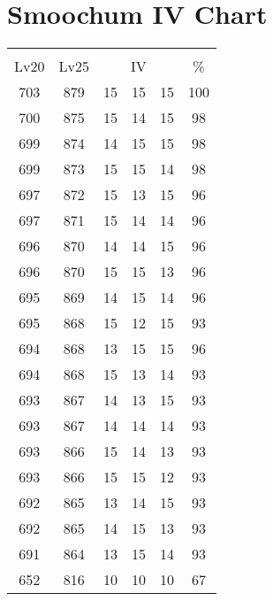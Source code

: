 \documentclass{article}%
\begin{document}
%
\normalsize%
\section{Smoochum IV Chart}%
\label{sec:Smoochum IV Chart}%
\renewcommand{\arraystretch}{1.5}%
\begin{tabular}{|c|c|c|c|c|c|}%
\hline%
\multicolumn{6}{|c|}{\textcolor{white}{ 
\linebreak{Smoochum}
}%
\cellcolor{black}}\\%
\multicolumn{1}{|c}{Lv20}&\multicolumn{1}{c|}{Lv25}&\multicolumn{3}{c|}{IV}&\multicolumn{1}{|c|}{\%}\\%
\hline%
\rowcolor{color100}%
703&879&15&15&15&100\\%
\hline%
\rowcolor{color98}%
700&875&15&14&15&98\\%
\hline%
\rowcolor{color98}%
699&874&14&15&15&98\\%
\hline%
\rowcolor{color98}%
699&873&15&15&14&98\\%
\hline%
\rowcolor{color96}%
697&872&15&13&15&96\\%
\hline%
\rowcolor{color96}%
697&871&15&14&14&96\\%
\hline%
\rowcolor{color96}%
696&870&14&14&15&96\\%
\hline%
\rowcolor{color96}%
696&870&15&15&13&96\\%
\hline%
\rowcolor{color96}%
695&869&14&15&14&96\\%
\hline%
\rowcolor{color93}%
695&868&15&12&15&93\\%
\hline%
\rowcolor{color96}%
694&868&13&15&15&96\\%
\hline%
\rowcolor{color93}%
694&868&15&13&14&93\\%
\hline%
\rowcolor{color93}%
693&867&14&13&15&93\\%
\hline%
\rowcolor{color93}%
693&867&14&14&14&93\\%
\hline%
\rowcolor{color93}%
693&866&15&14&13&93\\%
\hline%
\rowcolor{color93}%
693&866&15&15&12&93\\%
\hline%
\rowcolor{color93}%
692&865&13&14&15&93\\%
\hline%
\rowcolor{color93}%
692&865&14&15&13&93\\%
\hline%
\rowcolor{color93}%
691&864&13&15&14&93\\%
\hline%
\rowcolor{color91}%
652&816&10&10&10&67\\%
\end{tabular}

%
\end{document}
